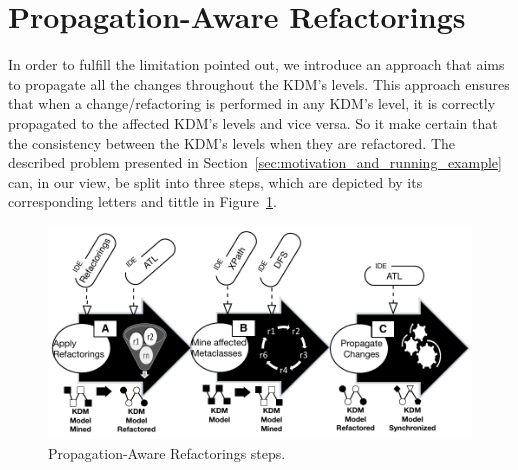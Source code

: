 %
\section{Propagation-Aware Refactorings} %
\label{sec:the_approach}

In order to fulfill the limitation pointed out, we introduce an approach that aims to propagate all the changes throughout the KDM's levels. This approach ensures that when a change/refactoring is performed in any KDM's level, it is correctly propagated to the affected KDM's levels and vice versa. So it make certain that the consistency between the KDM's levels when they are refactored. 
The described problem presented in Section~\ref{sec:motivation_and_running_example} can, in our view, be split into three steps, which are depicted by its corresponding letters and tittle in Figure~\ref{fig:approach}. 



\begin{figure}[h]
	\centering
	\includegraphics[scale=0.54]{figuras/approachSteps}
	\caption{Propagation-Aware Refactorings steps.}
	\label{fig:approach}
\end{figure}


